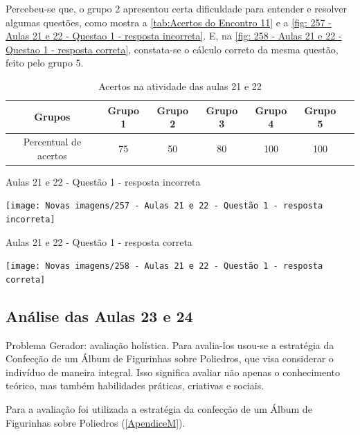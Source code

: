 Percebeu-se que, o grupo 2 apresentou certa dificuldade para entender e resolver algumas questões, como mostra a \autoref{tab:Acertos do Encontro 11} e a \autoref{fig: 257 - Aulas 21 e 22 - Questao 1 - resposta incorreta}. E, na \autoref{fig: 258 - Aulas 21 e 22 - Questao 1 - resposta correta}, constata-se o cálculo correto da mesma questão, feito pelo grupo 5.

\begin{table}[htbp] \centering
    \caption{Acertos na atividade das aulas 21 e 22} \label{tab:Acertos do Encontro 11}
    \begin{tabular}{|c|c|c|c|c|c|c|}
        \hline
        \textbf{Grupos}       & \textbf{Grupo 1} & \textbf{Grupo 2} & \textbf{Grupo 3} & \textbf{Grupo 4} & \textbf{Grupo 5} \\
        \hline
        Percentual de acertos & 75               & 50               & 80               & 100              & 100              \\
        \hline
    \end{tabular}
    \legend{\legendaTabela}
\end{table}

\begin{CenteredFigure}
    \caption{Aulas 21 e 22 - Questão 1 - resposta incorreta} \label{fig: 257 - Aulas 21 e 22 - Questao 1 - resposta incorreta}
    \texttt{[image: Novas imagens/257 - Aulas 21 e 22 - Questão 1 - resposta incorreta]}
    \legend{\autoria}
\end{CenteredFigure}

\begin{CenteredFigure}
    \caption{Aulas 21 e 22 - Questão 1 - resposta correta} \label{fig: 258 - Aulas 21 e 22 - Questao 1 - resposta correta}
    \texttt{[image: Novas imagens/258 - Aulas 21 e 22 - Questão 1 - resposta correta]}
    \legend{\autoria}
\end{CenteredFigure}

\subsection{Análise das Aulas 23 e 24}

Problema Gerador: avaliação holística. Para avalia-los usou-se a estratégia da Confecção de um Álbum de Figurinhas sobre Poliedros, que visa considerar o indivíduo de maneira integral. Isso significa avaliar não apenas o conhecimento teórico, mas também habilidades práticas, criativas e sociais.

Para a avaliação foi utilizada a estratégia da confecção de um Álbum de Figurinhas sobre Poliedros (\autoref{ApendiceM}).

